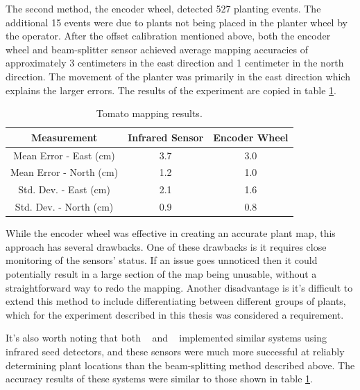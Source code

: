 The second method, the encoder wheel, detected 527 planting events.  The additional 15 events were due to plants not being placed in the planter wheel by the operator.  After the offset calibration mentioned above, both the encoder wheel and beam-splitter sensor achieved average mapping accuracies of approximately 3 centimeters in the east direction and 1 centimeter in the north direction.  The movement of the planter was primarily in the east direction which explains the larger errors.  The results of the experiment are copied in table \ref{table:tomato_results}.  

\begin{table}
    \begin{center}
    \caption[Tomato mapping results]{Tomato mapping results.}
    \begin{tabular}[c]{|c|c|c|}
        \hline
        Measurement & Infrared Sensor & Encoder Wheel \\
        \hline
        Mean Error - East (cm)   & 3.7       &  3.0    \\
        Mean Error - North (cm)  & 1.2       & 1.0     \\
        Std. Dev. - East (cm)    & 2.1       & 1.6     \\
        Std. Dev. - North (cm)   & 0.9       & 0.8     \\
        \hline
    \end{tabular}
    \label{table:tomato_results}
   \end{center}
\end{table} 
          
While the encoder wheel was effective in creating an accurate plant map, this approach has several drawbacks. One of these drawbacks is it requires close monitoring of the sensors' status. If an issue goes unnoticed then it could potentially result in a large section of the map being unusable, without a straightforward way to redo the mapping. Another disadvantage is it's difficult to extend this method to include differentiating between different groups of plants, which for the experiment described in this thesis was considered a requirement.
          
It's also worth noting that both ~\citep{Nørremark:2007} and ~\citep{Ehsani:2004} implemented similar systems using infrared seed detectors, and these sensors were much more successful at reliably determining plant locations than the beam-splitting method described above.  The accuracy results of these systems were similar to those shown in table \ref{table:tomato_results}.
          
